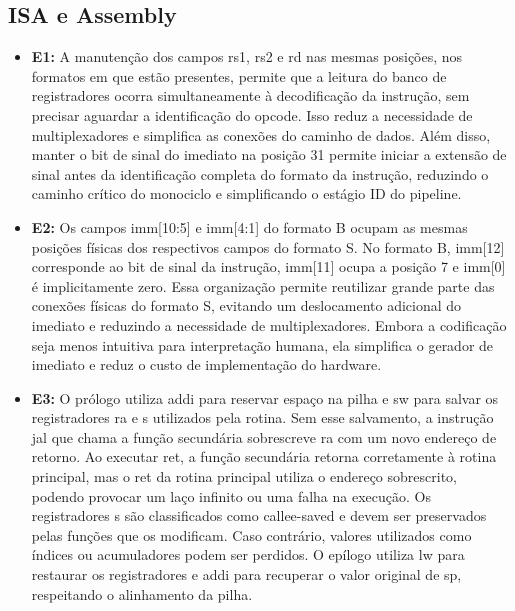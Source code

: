 \documentclass[12pt,a4paper,titlepage]{article}
\begin{document}
\subsection{ISA e Assembly}
\begin{itemize}
    \item\textbf{E1:}
        A manutenção dos campos rs1, rs2 e rd nas mesmas posições, nos formatos em que estão presentes, permite que a leitura do banco
        de registradores ocorra simultaneamente à decodificação da instrução, sem precisar aguardar a identificação do opcode.
        Isso reduz a necessidade de multiplexadores e simplifica as conexões do caminho de dados.
        Além disso, manter o bit de sinal do imediato na posição 31 permite iniciar a extensão de sinal antes da identificação completa
        do formato da instrução, reduzindo o caminho crítico do monociclo e simplificando o estágio ID do pipeline.

    \item\textbf{E2:}
        Os campos imm[10:5] e imm[4:1] do formato B ocupam as mesmas posições físicas dos respectivos campos do formato S.
        No formato B, imm[12] corresponde ao bit de sinal da instrução, imm[11] ocupa a posição 7 e imm[0] é implicitamente zero.
        Essa organização permite reutilizar grande parte das conexões físicas do formato S, evitando um deslocamento adicional do
        imediato e reduzindo a necessidade de multiplexadores. Embora a codificação seja menos intuitiva para interpretação humana,
        ela simplifica o gerador de imediato e reduz o custo de implementação do hardware.

    \item\textbf{E3:}
        O prólogo utiliza addi para reservar espaço na pilha e sw para salvar os registradores ra e s utilizados pela rotina.
        Sem esse salvamento, a instrução jal que chama a função secundária sobrescreve ra com um novo endereço de retorno.
        Ao executar ret, a função secundária retorna corretamente à rotina principal, mas o ret da rotina principal utiliza o
        endereço sobrescrito, podendo provocar um laço infinito ou uma falha na execução.
        Os registradores s são classificados como callee-saved e devem ser preservados pelas funções que os modificam.
        Caso contrário, valores utilizados como índices ou acumuladores podem ser perdidos. O epílogo utiliza lw para restaurar
        os registradores e addi para recuperar o valor original de sp, respeitando o alinhamento da pilha.


\end{itemize}
\end{document}
